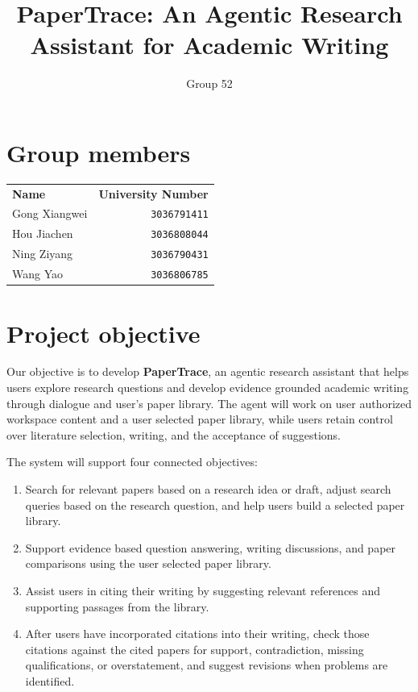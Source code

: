 \documentclass{article}
\title{PaperTrace: An Agentic Research Assistant for Academic Writing}
\author{Group 52}
\begin{document}
\maketitle
\nolinenumbers

\section{Group members}
\label{sec:group-members}

\begin{center}
\begin{tabular*}{0.8\linewidth}{@{\extracolsep{\fill}}lr}
\textbf{Name} & \textbf{University Number} \\
Gong Xiangwei & \texttt{3036791411} \\
Hou Jiachen & \texttt{3036808044} \\
Ning Ziyang & \texttt{3036790431} \\
Wang Yao & \texttt{3036806785} \\
\end{tabular*}
\end{center}

\section{Project objective}

Our objective is to develop \textbf{PaperTrace}, an agentic research assistant that helps users explore research questions and develop evidence grounded academic writing through dialogue and user's paper library. The agent will work on user authorized workspace content and a user selected paper library, while users retain control over literature selection, writing, and the acceptance of suggestions.

The system will support four connected objectives:
\begin{enumerate}
    \item Search for relevant papers based on a research idea or draft, adjust search queries based on the research question, and help users build a selected paper library.
    \item Support evidence based question answering, writing discussions, and paper comparisons using the user selected paper library.
    \item Assist users in citing their writing by suggesting relevant references and supporting passages from the library.
    \item After users have incorporated citations into their writing, check those citations against the cited papers for support, contradiction, missing qualifications, or overstatement, and suggest revisions when problems are identified.
\end{enumerate}
\end{document}
